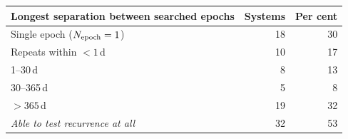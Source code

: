 \begin{tabular}{@{}lrr@{}}
\toprule
Longest separation between searched epochs & Systems & Per cent \\
\midrule
Single epoch ($N_{\rm epoch}=1$) & 18 & 30 \\
Repeats within $<1$\,d & 10 & 17 \\
1--30\,d & 8 & 13 \\
30--365\,d & 5 & 8 \\
$>365$\,d & 19 & 32 \\
\midrule
\emph{Able to test recurrence at all} & 32 & 53 \\
\bottomrule
\end{tabular}
